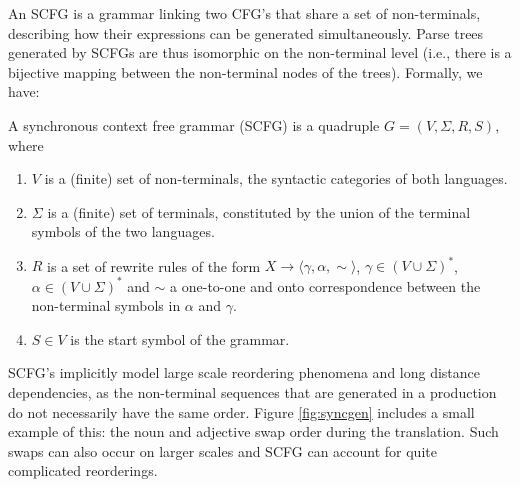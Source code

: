 An SCFG \citep{aho1969properties} is a grammar linking two CFG's that share a set of non-terminals, describing how their expressions can be generated simultaneously. Parse trees generated by SCFGs are thus isomorphic on the non-terminal level (i.e., there is a bijective mapping between the non-terminal nodes of the trees). Formally, we have:

\begin{definition}
A synchronous context free grammar (SCFG) is a quadruple $G = (V, \Sigma, R, S)$, where\begin{enumerate}
\item $V$ is a (finite) set of non-terminals, the syntactic categories of both languages.
\item $\Sigma$ is a (finite) set of terminals, constituted by the union of the terminal symbols of the two languages.
\item $R$ is a set of rewrite rules of the form $X\rightarrow\langle\gamma,\alpha,\sim\rangle$, $\gamma\in (V\cup\Sigma)^{*}$,  $\alpha\in (V\cup\Sigma)^{*}$ and $\sim$ a one-to-one and onto correspondence between the non-terminal symbols in $\alpha$ and $\gamma$.
\item $S\in V$ is the start symbol of the grammar.
\end{enumerate}
\end{definition}

SCFG's implicitly model large scale reordering phenomena and long distance dependencies, as the non-terminal sequences that are generated in a production do not necessarily have the same order. Figure \ref{fig:syncgen} includes a small example of this: the noun and adjective swap order during the translation. Such swaps can also occur on larger scales and SCFG can account for quite complicated reorderings.

